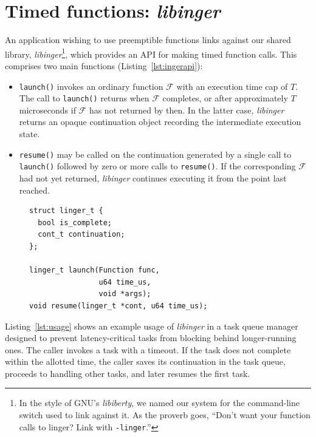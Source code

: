 \section{Timed functions: \textit{libinger}}
\label{sec:libinger}

An application wishing to use preemptible functions links against our shared library,
\textit{libinger}\footnote{In the style of GNU's \textit{libiberty}, we named our
system for the command-line switch used to link against it.  As the proverb goes,
``Don't want your function calls to linger?  Link with \texttt{-linger}.''}, which
provides an API for making timed function calls.  This comprises two main functions
(Listing~\ref{lst:ingerapi}):
\begin{itemize}
\item \texttt{launch()} invokes an ordinary function $\mathcal{F}$ with an
execution time cap of $T$.  The call to \texttt{launch()} returns when $\mathcal{F}$
completes, or after approximately $T$ microseconds if $\mathcal{F}$ has not returned
by then.  In the latter case, \textit{libinger} returns an opaque continuation
object recording the intermediate execution state.
\item \texttt{resume()} may be called on the continuation generated by a single call
to \texttt{launch()} followed by zero or more calls to \texttt{resume()}.  If the
corresponding $\mathcal{F}$ had not yet returned, \textit{libinger} continues
executing it from the point last reached.
\end{itemize}

\begin{figure}
\begin{lstlisting}[label=lst:ingerapi,caption=Preemptible functions interface]
struct linger_t {
  bool is_complete;
  cont_t continuation;
};

linger_t launch(Function func,
                u64 time_us,
                void *args);
void resume(linger_t *cont, u64 time_us);
\end{lstlisting}
\end{figure}

Listing~\ref{lst:usage} shows an example usage of \textit{libinger}
in a task queue manager designed to prevent latency-critical tasks from blocking
behind longer-running
ones. The caller invokes a task with a timeout. If the task does not complete
within the allotted time, the caller saves its continuation in the task queue,
proceeds to handling other tasks, and later resumes the first task.

